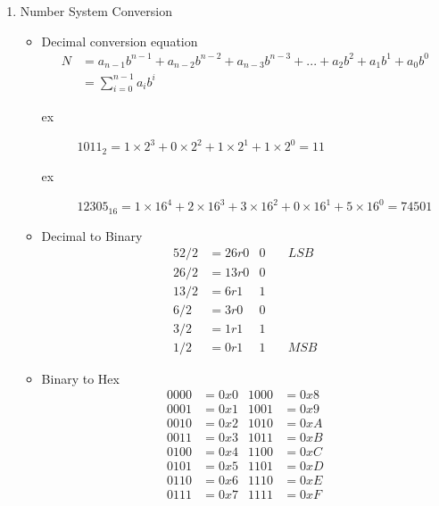 \documentclass[main.tex]{subfiles}
\begin{document}
\begin{enumerate}
    \item Number System Conversion
    \begin{itemize}
        \item Decimal conversion equation 
        \begin{align*}
            N &= a_{n-1}b^{n-1} + a_{n-2}b^{n-2} + a_{n-3}b^{n-3} + ... + a_2b^2 + a_1b^1 + a_0b^0 \\
            &= \sum_{i=0}^{n-1}a_ib^i
        \end{align*}
        
        \begin{description}
            \item[ex] $1011_2 = 1\times2^3 + 0\times2^2 + 1\times2^1 + 1\times2^0 = 11$
            \item[ex] $12305_{16} = 1\times16^4 + 2\times16^3 + 3\times16^2 + 0\times16^1 + 5\times16^0 = 74501$
        \end{description}
        \item Decimal to Binary 
        \begin{align*}
            52 / 2 &= 26 r 0 & 0\quad  & LSB\\
            26 / 2 &= 13 r 0 & 0\quad  &\\
            13 / 2 &= 6 r 1 & 1\quad  &\\
            6 / 2 &= 3 r 0 & 0\quad  &\\
            3 / 2 &= 1 r 1 & 1\quad  & \\ 
            1 / 2 &= 0 r 1 & 1\quad  & MSB
        \end{align*}
        \item Binary to Hex
        \begin{align*}
            0000 &= 0x0 & 1000 &= 0x8  \\
            0001 &= 0x1 & 1001 &= 0x9  \\
            0010 &= 0x2 & 1010 &= 0xA  \\
            0011 &= 0x3 & 1011 &= 0xB  \\
            0100 &= 0x4 & 1100 &= 0xC  \\
            0101 &= 0x5 & 1101 &= 0xD  \\
            0110 &= 0x6 & 1110 &= 0xE  \\
            0111 &= 0x7 & 1111 &= 0xF  \\
        \end{align*}
    \end{itemize}

\end{enumerate}
\end{document}
